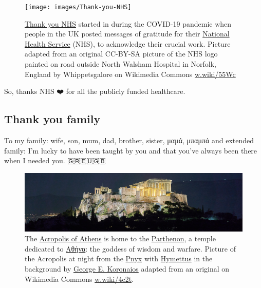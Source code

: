 \documentclass[
]{book}
\begin{document}
\begin{figure}

{\centering \texttt{[image: images/Thank-you-NHS]} 

}

\caption{\href{https://en.wikipedia.org/wiki/Thank_You_NHS}{Thank you NHS} started in during the COVID-19 pandemic when people in the UK posted messages of gratitude for their \href{https://en.wikipedia.org/wiki/National_Health_Service}{National Health Service} (NHS), to acknowledge their crucial work. Picture adapted from an original CC-BY-SA picture of the NHS logo painted on road outside North Walsham Hospital in Norfolk, England by Whippetsgalore on Wikimedia Commons \href{https://w.wiki/55Wc}{w.wiki/55Wc}}\label{fig:nhs-fig}
\end{figure}



So, thanks NHS ❤️ for all the publicly funded healthcare. 🙏

\hypertarget{family}{%
\subsection{Thank you family}\label{family}}

To my family: wife, son, mum, dad, brother, sister, μαμά, μπαμπά and extended family: I'm lucky to have been taught by you and that you've always been there when I needed you. 🇬🇷🇪🇺🇬🇧

\begin{figure}
\includegraphics[width=1\linewidth]{images/acropolis-at-night} \caption{The \href{https://en.wikipedia.org/wiki/Acropolis_of_Athens}{Acropolis of Athens} is home to the \href{https://en.wikipedia.org/wiki/Parthenon}{Parthenon}, a temple dedicated to \href{https://en.wikipedia.org/wiki/Athena}{Αθήνα}: the goddess of wisdom and warfare. Picture of the Acropolis at night from the \href{https://en.wikipedia.org/wiki/Pnyx}{Pnyx} with \href{https://en.wikipedia.org/wiki/Hymettus}{Hymettus} in the background by \href{https://commons.wikimedia.org/wiki/User:George_E._Koronaios}{George E. Koronaios} adapted from an original on Wikimedia Commons \href{https://w.wiki/4c2t}{w.wiki/4c2t}.}\label{fig:acropolis-fig}
\end{figure}
\end{document}
